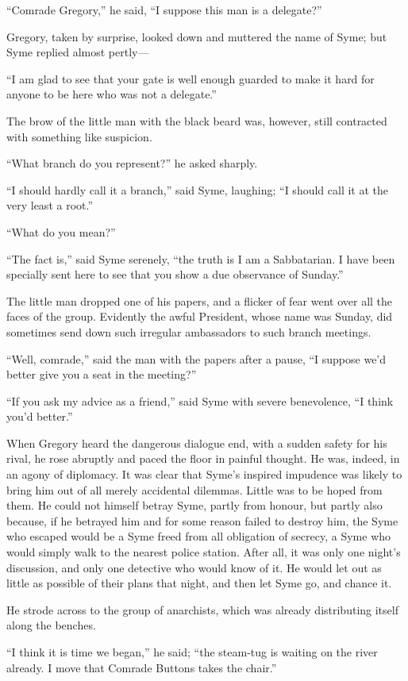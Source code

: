 \documentclass{book}
\begin{document}
“Comrade Gregory,” he said, “I suppose this man is a delegate?”

Gregory, taken by surprise, looked down and muttered the name of Syme; but Syme replied almost pertly—

“I am glad to see that your gate is well enough guarded to make it hard for anyone to be here who was not a delegate.”

The brow of the little man with the black beard was, however, still contracted with something like suspicion.

“What branch do you represent?” he asked sharply.

“I should hardly call it a branch,” said Syme, laughing; “I should call it at the very least a root.”

“What do you mean?”

“The fact is,” said Syme serenely, “the truth is I am a Sabbatarian. I have been specially sent here to see that you show a due observance of Sunday.”

The little man dropped one of his papers, and a flicker of fear went over all the faces of the group. Evidently the awful President, whose name was Sunday, did sometimes send down such irregular ambassadors to such branch meetings.

“Well, comrade,” said the man with the papers after a pause, “I suppose we’d better give you a seat in the meeting?”

“If you ask my advice as a friend,” said Syme with severe benevolence, “I think you’d better.”

When Gregory heard the dangerous dialogue end, with a sudden safety for his rival, he rose abruptly and paced the floor in painful thought. He was, indeed, in an agony of diplomacy. It was clear that Syme’s inspired impudence was likely to bring him out of all merely accidental dilemmas. Little was to be hoped from them. He could not himself betray Syme, partly from honour, but partly also because, if he betrayed him and for some reason failed to destroy him, the Syme who escaped would be a Syme freed from all obligation of secrecy, a Syme who would simply walk to the nearest police station. After all, it was only one night’s discussion, and only one detective who would know of it. He would let out as little as possible of their plans that night, and then let Syme go, and chance it.

He strode across to the group of anarchists, which was already distributing itself along the benches.

“I think it is time we began,” he said; “the steam-tug is waiting on the river already. I move that Comrade Buttons takes the chair.”
\end{document}
